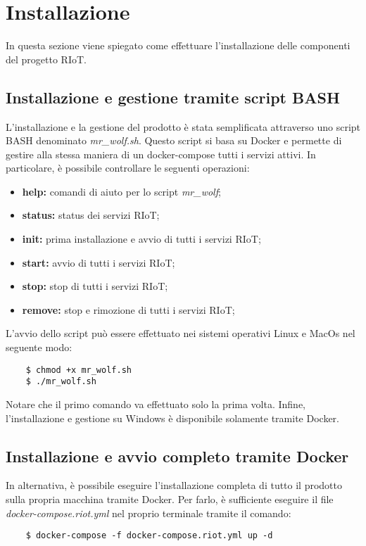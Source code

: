 \section{Installazione}
	In questa sezione viene spiegato come effettuare l'installazione delle componenti del progetto RIoT.

	\subsection{Installazione e gestione tramite script BASH}

	L'installazione e la gestione del prodotto è stata semplificata attraverso uno script BASH denominato \textit{mr\_wolf.sh}. Questo script si basa su Docker e permette di gestire alla stessa maniera di un docker-compose tutti i servizi attivi.
	In particolare, è possibile controllare le seguenti operazioni: 
	\begin{itemize}
		\item \textbf{help:}  	comandi di aiuto per lo script \textit{mr\_wolf};
    	\item \textbf{status:}  status dei servizi RIoT;
    	\item \textbf{init:}  	prima installazione e avvio di tutti i servizi RIoT;
    	\item \textbf{start:} 	avvio di tutti i servizi RIoT;
    	\item \textbf{stop:}  	stop di tutti i servizi RIoT;
    	\item \textbf{remove:}	stop e rimozione di tutti i servizi RIoT;
	\end{itemize}
	L'avvio dello script può essere effettuato nei sistemi operativi Linux e MacOs nel seguente modo:
	\begin{verbatim}
	$ chmod +x mr_wolf.sh
	$ ./mr_wolf.sh
	\end{verbatim}
	Notare che il primo comando va effettuato solo la prima volta. Infine, l'installazione e gestione su Windows è disponibile solamente tramite Docker.

	\subsection{Installazione e avvio completo tramite Docker}
	
	In alternativa, è possibile eseguire l'installazione completa di tutto il prodotto sulla propria macchina tramite Docker. Per farlo, è sufficiente eseguire il file \textit{docker-compose.riot.yml} nel proprio terminale tramite il comando:
	\begin{verbatim}
	$ docker-compose -f docker-compose.riot.yml up -d
	\end{verbatim}

